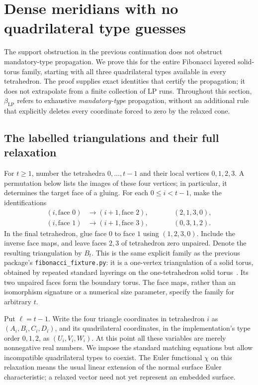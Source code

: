 \section{Dense meridians with no quadrilateral type guesses}
\label{sec:fibonacci}

The support obstruction in the previous continuation does not obstruct
mandatory-type propagation.  We prove this for the entire Fibonacci layered
solid-torus family, starting with all three quadrilateral types available in
every tetrahedron.  The proof supplies exact identities that certify the
propagation; it does not extrapolate from a finite collection of LP runs.
Throughout this section, $\beta_{\mathrm{LP}}$ refers to exhaustive
\emph{mandatory-type} propagation, without an additional rule that explicitly
deletes every coordinate forced to zero by the relaxed cone.

\subsection{The labelled triangulations and their full relaxation}

For $t\ge1$, number the tetrahedra $0,\ldots,t-1$ and their local vertices
$0,1,2,3$.  A permutation below lists the images of these four vertices;
in particular, it determines the target face of a gluing.  For each
$0\le i<t-1$, make the identifications
\begin{equation}
\begin{aligned}
 (i,\text{face }0)&\longrightarrow
       (i+1,\text{face }2),&\qquad &(2,1,3,0),\\
 (i,\text{face }1)&\longrightarrow
       (i+1,\text{face }3),& &(0,3,1,2).
\end{aligned}
\label{eq:fib-face-gluings}
\end{equation}
In the final tetrahedron, glue face $0$ to face $1$ using
$(1,2,3,0)$.  Include the inverse face maps, and leave faces $2,3$ of
tetrahedron zero unpaired.  Denote the resulting triangulation by $B_t$.
This is the same explicit family as the previous package's
\texttt{fibonacci\_fixture.py}: it is a one-vertex triangulation of a solid
torus, obtained by repeated standard layerings on the one-tetrahedron solid
torus~\cite{priorKernel}.  Its two unpaired faces form the boundary torus.
The face maps, rather than an isomorphism signature or a numerical size
parameter, specify the family for arbitrary $t$.

Put $\ell=t-1$.  Write the four triangle coordinates in tetrahedron $i$ as
$(A_i,B_i,C_i,D_i)$, and its quadrilateral coordinates, in the implementation's
type order $0,1,2$, as $(U_i,V_i,W_i)$.  At this point all these variables are
merely nonnegative real numbers.  We impose the standard matching equations
but allow incompatible quadrilateral types to coexist.  The Euler functional
$\chi$ on this relaxation means the usual linear extension of the normal
surface Euler characteristic; a relaxed vector need not yet represent an
embedded surface.

